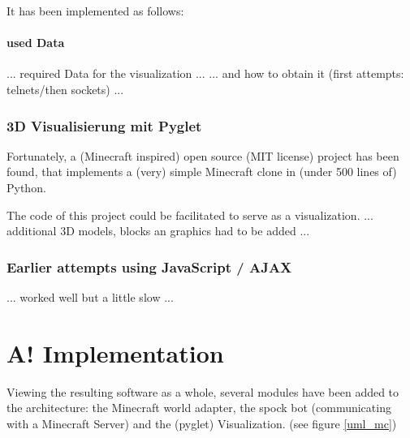 It has been implemented as follows:

\paragraph{used Data}
... required Data for the visualization ...
... and how to obtain it (first attempts: telnets/then sockets) ...

\subsubsection{3D Visualisierung mit Pyglet}
Fortunately, a (Minecraft inspired) open source (MIT license) project has been found, that implements a (very) simple Minecraft clone in (under 500 lines of) Python.\cite{github_minecraftpython}

The code of this project could be facilitated to serve as a visualization.
... additional 3D models, blocks an graphics had to be added ...

\subsubsection{Earlier attempts using JavaScript / AJAX}
... worked well but a little slow ...

\section{A! Implementation}

Viewing the resulting software as a whole, several modules have been added to the architecture: the Minecraft world adapter, the spock bot (communicating with a Minecraft Server) and the (pyglet) Visualization. (see figure \ref{uml_mc})

